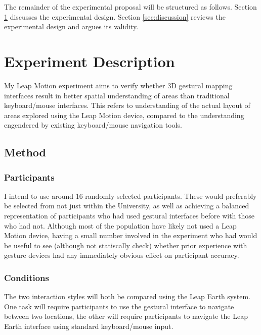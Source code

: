 \documentclass{sigplanconf}
\begin{document}
The remainder of the experimental proposal will be structured as follows. Section \ref{sec:experiment} discusses the experimental design. Section \ref{sec:discussion} reviews the experimental design and argues its validity.



\section{Experiment Description}
\label{sec:experiment}

My Leap Motion experiment aims to verify whether 3D gestural mapping interfaces result in better spatial understanding of areas than traditional keyboard/mouse interfaces. This refers to understanding of the actual layout of areas explored using the Leap Motion device, compared to the understanding engendered by existing keyboard/mouse navigation tools.

\subsection{Method}

\subsubsection{Participants}

I intend to use around 16 randomly-selected participants. These would preferably be selected from not just within the University, as well as achieving a balanced representation of participants who had used gestural interfaces before with those who had not. Although most of the population have likely not used a Leap Motion device, having a small number involved in the experiment who had would be useful to see (although not statiscally check) whether prior experience with gesture devices had any immediately obvious effect on participant accuracy.

\subsubsection{Conditions}

The two interaction styles will both be compared using the Leap Earth system. One task will require participants to use the gestural interface to navigate between two locations, the other will require participants to navigate the Leap Earth interface using standard keyboard/mouse input. 
\end{document}
